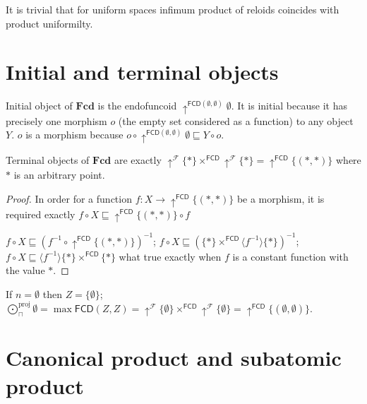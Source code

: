 It is trivial that for uniform spaces infimum product of reloids coincides
with product uniformilty.

\section{Initial and terminal objects}

Initial object of $\mathbf{Fcd}$ is the endofuncoid
$\uparrow^{\mathsf{FCD} (\emptyset , \emptyset)} \emptyset$. It is
initial because it has precisely one morphism $o$ (the empty set considered as
a function) to any object $Y$. $o$ is a morphism because $o \circ
\uparrow^{\mathsf{FCD} (\emptyset , \emptyset)} \emptyset \sqsubseteq Y
\circ o$.

\begin{prop}
  Terminal objects of $\mathbf{Fcd}$ are exactly
  $\uparrow^{\mathscr{F}} \{ \ast \} \times^{\mathsf{FCD}}
  \uparrow^{\mathscr{F}} \{ \ast \} = \uparrow^{\mathsf{FCD}} \{ (\ast
  , \ast) \}$ where $\ast$ is an arbitrary point.
\end{prop}

\begin{proof}
  In order for a function $f : X \rightarrow \uparrow^{\mathsf{FCD}} \{
  (\ast , \ast) \}$ be a morphism, it is required exactly $f \circ X
  \sqsubseteq \uparrow^{\mathsf{FCD}} \{ (\ast , \ast) \} \circ f$
  
  $f \circ X \sqsubseteq (f^{- 1} \circ \uparrow^{\mathsf{FCD}} \{
  (\ast , \ast) \})^{- 1}$; $f \circ X \sqsubseteq (\{ \ast \}
  \times^{\mathsf{FCD}} \langle f^{- 1} \rangle \{ \ast \})^{- 1}$; $f
  \circ X \sqsubseteq \langle f^{- 1} \rangle \{ \ast \}
  \times^{\mathsf{FCD}} \{ \ast \}$ what true exactly when $f$ is a
  constant function with the value $\ast$.
\end{proof}

If $n = \emptyset$ then $Z = \{ \emptyset \}$; $\bigodot^{\text{proj}}_{\sqcap} \emptyset = \max
\mathsf{FCD} (Z , Z) = \uparrow^{\mathscr{F}} \{ \emptyset \}
\times^{\mathsf{FCD}} \uparrow^{\mathscr{F}} \{ \emptyset \} =
\uparrow^{\mathsf{FCD}} \{ (\emptyset , \emptyset) \}$.


\section{Canonical product and subatomic product}


